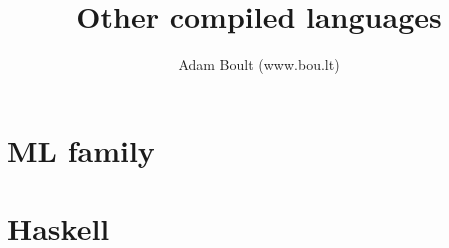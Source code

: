\documentclass[oneside]{book}
\begin{document}
\author{Adam Boult (www.bou.lt)}
\title{Other compiled languages}
\maketitle

\setcounter{tocdepth}{0}
\tableofcontents



\part{ML family}

\part{Haskell}
\end{document}
